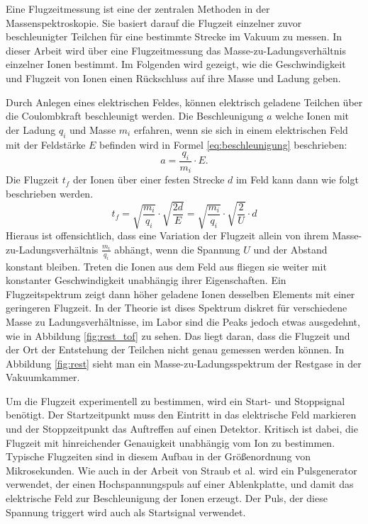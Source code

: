 Eine Flugzeitmessung ist eine der zentralen Methoden in der Massenspektroskopie. Sie basiert darauf die Flugzeit einzelner zuvor beschleunigter Teilchen für eine bestimmte Strecke im Vakuum zu messen. In dieser Arbeit wird über eine Flugzeitmessung das Masse-zu-Ladungsverhältnis einzelner Ionen bestimmt. Im Folgenden wird gezeigt, wie die Geschwindigkeit und Flugzeit von Ionen einen Rückschluss auf ihre Masse und Ladung geben.

Durch Anlegen eines elektrischen Feldes, können elektrisch geladene Teilchen über die Coulombkraft beschleunigt werden. Die Beschleunigung $a$ welche Ionen mit der Ladung $q_i$ und Masse $m_i$ erfahren, wenn sie sich in einem elektrischen Feld mit der Feldstärke $E$ befinden wird in Formel \ref{eq:beschleunigung} beschrieben: 
\begin{equation}
    \label{eq:beschleunigung}
    a = \frac{q_i}{m_i} \cdot E.
\end{equation}
Die Flugzeit $t_f$ der Ionen über einer festen Strecke $d$ im Feld kann dann wie folgt beschrieben werden.
\begin{equation}
    t_f = \sqrt{\frac{m_i}{q_i}} \cdot \sqrt{\frac{2d}{E}} = \sqrt{\frac{m_i}{q_i}} \cdot \sqrt{\frac{2}{U}} \cdot d
\end{equation}
Hieraus ist offensichtlich, dass eine Variation der Flugzeit allein von ihrem Masse-zu-Ladungsverhältnis $\frac{m_i}{q_i}$ abhängt, wenn die Spannung $U$ und der Abstand konstant bleiben. Treten die Ionen aus dem Feld aus fliegen sie weiter mit konstanter Geschwindigkeit unabhängig ihrer Eigenschaften. Ein Flugzeitspektrum zeigt dann höher geladene Ionen desselben Elements mit einer geringeren Flugzeit. In der Theorie ist dises Spektrum diskret für verschiedene Masse zu Ladungsverhältnisse, im Labor sind die Peaks jedoch etwas ausgedehnt, wie in Abbildung \ref{fig:rest_tof} zu sehen. Das liegt daran, dass die Flugzeit und der Ort der Entstehung der Teilchen nicht genau gemessen werden können. In Abbildung \ref{fig:rest} sieht man ein Masse-zu-Ladungsspektrum der Restgase in der Vakuumkammer. 

Um die Flugzeit experimentell zu bestimmen, wird ein Start- und Stoppsignal benötigt. Der Startzeitpunkt muss den Eintritt in das elektrische Feld markieren und der Stoppzeitpunkt das Auftreffen auf einen Detektor. Kritisch ist dabei, die Flugzeit mit hinreichender Genauigkeit unabhängig vom Ion zu bestimmen. Typische Flugzeiten sind in diesem Aufbau in der Größenordnung von Mikrosekunden. Wie auch in der Arbeit von Straub et al. wird ein Pulsgenerator verwendet, der einen Hochspannungspuls auf einer Ablenkplatte, und damit das elektrische Feld zur Beschleunigung der Ionen erzeugt. Der Puls, der diese Spannung triggert wird auch als Startsignal verwendet.

